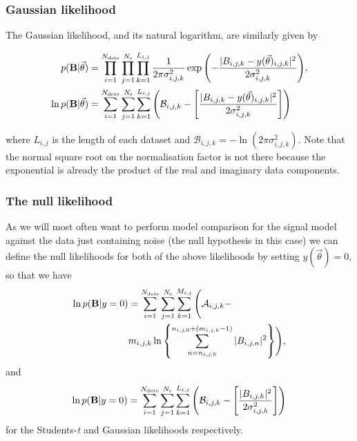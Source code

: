 \documentclass[aps,prd,showpacs,superscriptaddress,twocolumn,preprintnumbers,altaffilletter]{revtex4-1}
\begin{document}
\subsubsection{Gaussian likelihood}

The Gaussian likelihood, and its natural logarithm, are similarly given by
\begin{widetext}
\begin{align}\label{eq:gausslikelihood}
p(\mathbf{B}|\vec{\theta}) &= \prod_{i=1}^{N_{\rm dets}} \prod_{j=1}^{N_{\rm s}} \prod_{k=1}^{L_{i,j}}
\frac{1}{2\pi\sigma_{i,j,k}^2}\exp{\left(-\frac{|B_{i,j,k}-y(\vec{\theta})_{i,j,k}|^2}{2\sigma_{i,j,k}^2}
\right)}, \nonumber \\
\ln{p(\mathbf{B}|\vec{\theta})} &= \sum_{i=1}^{N_{\rm dets}} \sum_{j=1}^{N_{\rm s}}
\sum_{k=1}^{L_{i,j}} \left(\mathcal{B}_{i,j,k} -
\left[\frac{|B_{i,j,k}-y(\vec{\theta})_{i,j,k}|^2}{2\sigma_{i,j,k}^2 } \right] \right)
\end{align}
\end{widetext}
where $L_{i,j}$ is the length of each dataset and $\mathcal{B}_{i,j,k} = -\ln{(2\pi\sigma_{i,j,k}^2)}$. Note
that the normal square root on the normalisation factor is not there because the exponential is already the
product of the real and imaginary data components.

\subsubsection{The null likelihood}

As we will most often want to perform model comparison for the signal model against the data just containing
noise (the null hypothesis in this case) we can define the null likelihoods for both of the above likelihoods
by setting $y(\vec{\theta}) = 0$, so that we have
\begin{align}
\ln{p(\mathbf{B}|y=0)} &= \sum_{i=1}^{N_{\rm dets}} \sum_{j=1}^{N_{\rm s}}
\sum_{k=1}^{M_{i,j}} \Bigg( \mathcal{A}_{i,j,k} - \nonumber \\
&m_{i,j,k}\ln{
\left\{\sum_{n=n_{i,j,0}}^{n_{i,j,0}+(m_{i,j,k}-1)} |B_{i,j,n}|^2\right\}}
\Bigg),
\end{align}
and
\begin{equation}
\ln{p(\mathbf{B}|y=0)} = \sum_{i=1}^{N_{\rm dets}} \sum_{j=1}^{N_{\rm s}}
\sum_{k=1}^{L_{i,j}} \left(\mathcal{B}_{i,j,k} -
\left[\frac{|B_{i,j,k}|^2}{2\sigma_{i,j,k}^2 } \right] \right)
\end{equation}
for the Students-{\it t} and Gaussian likelihoods respectively.
\end{document}
